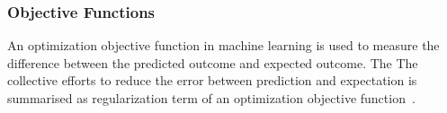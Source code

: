 \subsubsection{Objective Functions}
An optimization objective function in machine learning is used to measure the difference between the predicted outcome and expected outcome. The The collective efforts to reduce the error between prediction and expectation is summarised as regularization term of an optimization objective function~\cite{goodfellow_2015}.  